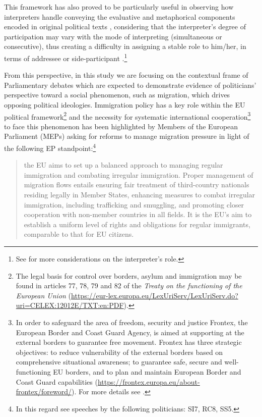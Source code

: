 \documentclass[output=paper]{langscibook}
\begin{document}
This framework has also proved to be particularly useful in observing how interpreters handle conveying the evaluative and metaphorical components encoded in original political texts \citep{Boyd2016}, considering that the interpreter’s degree of participation may vary with the mode of interpreting (simultaneous or consecutive), thus creating a difficulty in assigning a stable role to him/her, in terms of addressee or side-participant \citep{Poechhacker2004}.\footnote{See  for more considerations on the interpreter’s role.}

From this perspective, in this study we are focusing on the contextual frame of Parliamentary debates which are expected to demonstrate evidence of politicians’ perspective toward a social phenomenon, such as migration, which drives opposing political ideologies. Immigration policy has a key role within the EU political framework\footnote{The legal basis for control over borders, asylum and immigration may be found in articles 77, 78, 79 and 82 of the \textit{Treaty on the functioning of the European Union} (\url{https://eur-lex.europa.eu/LexUriServ/LexUriServ.do?uri=CELEX:12012E/TXT:en:PDF}).} and the necessity for systematic international cooperation\footnote{In order to safeguard the area of freedom, security and justice Frontex, the European Border and Coast Guard Agency, is aimed at supporting at the external borders to guarantee free movement. Frontex has three strategic objectives: to reduce vulnerability of the external borders based on comprehensive situational awareness; to guarantee safe, secure and well-functioning EU borders, and to plan and maintain European Border and Coast Guard capabilities (\url{https://frontex.europa.eu/about-frontex/foreword/}). For more details see \citet[17]{DiGiambattistaEtAl2015}.} to face this phenomenon has been highlighted by Members of the European Parliament (MEPs) asking for reforms to manage migration pressure in light of the following EP standpoint:\footnote{In this regard see speeches by the following politicians: SI7, RC8, SS5.}

\begin{quote}
the EU aims to set up a balanced approach to managing regular immigration and combating irregular immigration. Proper management of migration flows entails ensuring fair treatment of third-country nationals residing legally in Member States, enhancing measures to combat irregular immigration, including trafficking and smuggling, and promoting closer cooperation with non-member countries in all fields. It is the EU’s aim to establish a uniform level of rights and obligations for regular immigrants, comparable to that for EU citizens. \citep[1]{EP2021facts}
\end{quote}
\end{document}
